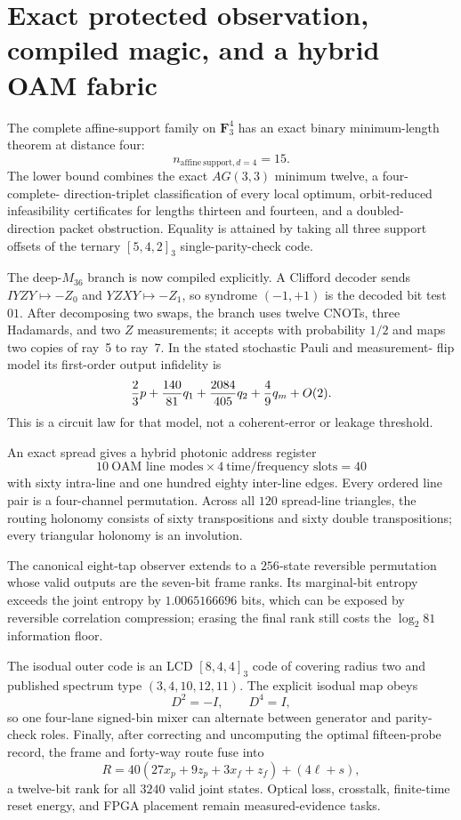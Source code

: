 \section{Exact protected observation, compiled magic, and a hybrid OAM fabric}
\label{sec:bt2946-bt2952}

The complete affine-support family on $\mathbf F_3^4$ has an exact binary
minimum-length theorem at distance four:
\[
 \boxed{n_{\mathrm{affine\ support},d=4}=15.}
\]
The lower bound combines the exact $AG(3,3)$ minimum twelve, a four-complete-
direction-triplet classification of every local optimum, orbit-reduced
infeasibility certificates for lengths thirteen and fourteen, and a doubled-
direction packet obstruction.  Equality is attained by taking all three support
offsets of the ternary $[5,4,2]_3$ single-parity-check code.

The deep-$M_{36}$ branch is now compiled explicitly.  A Clifford decoder sends
$IYZY\mapsto-Z_0$ and $YZXY\mapsto-Z_1$, so syndrome $(-1,+1)$ is the decoded
bit test $01$.  After decomposing two swaps, the branch uses twelve CNOTs, three
Hadamards, and two $Z$ measurements; it accepts with probability $1/2$ and maps
two copies of ray~5 to ray~7.  In the stated stochastic Pauli and measurement-
flip model its first-order output infidelity is
\[
 {2\over3}p+{140\over81}q_1+{2084\over405}q_2+{4\over9}q_m+O(2).
\]
This is a circuit law for that model, not a coherent-error or leakage threshold.

An exact spread gives a hybrid photonic address register
\[
 \boxed{10\ \text{OAM line modes}\times4\ \text{time/frequency slots}=40}
\]
with sixty intra-line and one hundred eighty inter-line edges.  Every ordered
line pair is a four-channel permutation.  Across all $120$ spread-line triangles,
the routing holonomy consists of sixty transpositions and sixty double
transpositions; every triangular holonomy is an involution.

The canonical eight-tap observer extends to a $256$-state reversible permutation
whose valid outputs are the seven-bit frame ranks.  Its marginal-bit entropy
exceeds the joint entropy by $1.0065166696$ bits, which can be exposed by
reversible correlation compression; erasing the final rank still costs the
$\log_2 81$ information floor.

The isodual outer code is an LCD $[8,4,4]_3$ code of covering radius two and
published spectrum type $(3,4,10,12,11)$.  The explicit isodual map obeys
\[
 D^2=-I,\qquad D^4=I,
\]
so one four-lane signed-bin mixer can alternate between generator and parity-
check roles.  Finally, after correcting and uncomputing the optimal fifteen-probe
record, the frame and forty-way route fuse into
\[
 R=40(27x_p+9z_p+3x_f+z_f)+(4\ell+s),
\]
a twelve-bit rank for all $3240$ valid joint states.  Optical loss, crosstalk,
finite-time reset energy, and FPGA placement remain measured-evidence tasks.
